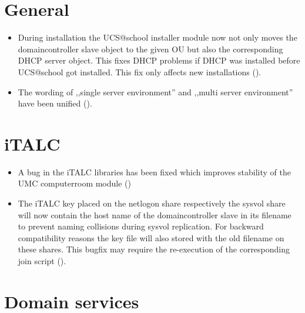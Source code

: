 \section{General}
\begin{itemize}
\item During installation the UCS@school installer module now not only moves the domaincontroller slave object
  to the given OU but also the corresponding DHCP server object. This fixes DHCP problems if DHCP was
  installed before UCS@school got installed. This fix only affects new installations ().
\item The wording of ,,single server environment'' and ,,multi server environment'' have been unified ().
\end{itemize}

 
\section{iTALC}
\begin{itemize}
\item A bug in the iTALC libraries has been fixed which improves stability of the UMC computerroom module ()
\item The iTALC key placed on the netlogon share respectively the sysvol share will now contain the host name
      of the domaincontroller slave in its filename to prevent naming collisions during sysvol replication. 
      For backward compatibility reasons the key file will also stored with the old filename on these shares. This
      bugfix may require the re-execution of the corresponding join script ().
\end{itemize}

\section{Domain services}


